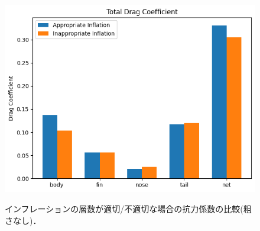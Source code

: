 \documentclass[uplatex,dvipdfmx,a4j,12pt]{jsarticle}
\begin{document}
\begin{figure}[H]
\begin{minipage}{0.45\linewidth}
      \centering
      \includegraphics[width=\linewidth]{wall_function/img/4_3_2_total_drag.png}
      \label{fig:4_3_2_cd_total}
  \end{minipage}
  \caption{インフレーションの層数が適切/不適切な場合の抗力係数の比較(粗さなし)．}
  \label{fig:4_3_cd_wo_rough}
\end{figure}
\end{document}

